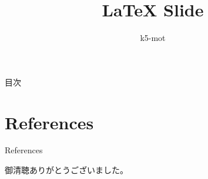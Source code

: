 \documentclass[dvipdfmx]{beamer}
\title{\LaTeX \hspace{2pt} Slide}
\subtitle{}
\author{k5-mot}
\institute{}
\date{\todayJP}
\begin{document}
%
%
{
  
%
  \begin{frame}[noframenumbering]
    \titlepage
  \end{frame}
%
  \begin{frame}[allowframebreaks]{目次}
    \begin{multicols}{2}
      \tableofcontents
    \end{multicols}
  \end{frame}
}
%

%

%

%
\section{References}
\begin{frame}[allowframebreaks]{References}
    \scriptsize
    \beamertemplatetextbibitems
    
    
\end{frame}
%
{
  
%
  \begin{frame}
    \begin{center}
      {\Huge 御清聴ありがとうございました。}
    \end{center}
  \end{frame}
}
%
%
\end{document}
